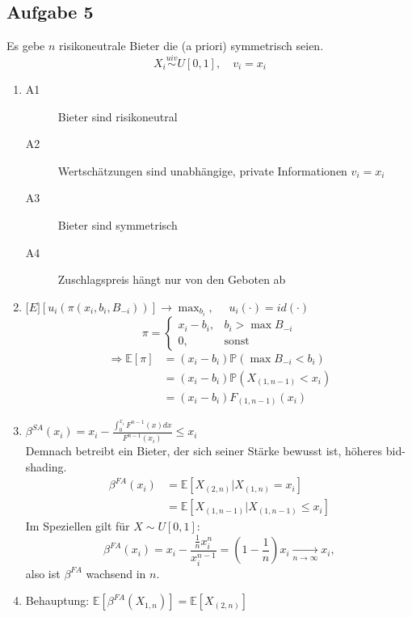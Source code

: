 \documentclass[12pt]{extreport} %
\theoremstyle{named}
\theoremstyle{itshape}
\theoremstyle{normal}
\begin{document}
\subsection*{Aufgabe 5}

Es gebe $n$ risikoneutrale Bieter die (a priori) symmetrisch seien.
$$ X_{i} \overset{uiv}{\sim} U[0,1], \quad v_i = x_i $$
\begin{enumerate}
	\item \begin{description}
		\item[A1] Bieter sind risikoneutral
		\item[A2] Wertschätzungen sind unabhängige, private Informationen $v_i = x_i$ 
		\item[A3] Bieter sind symmetrisch
		\item[A4] Zuschlagspreis hängt nur von den Geboten ab
	\end{description}
	\item $\mathds[E]\left[u_i\left(\pi\left(x_i, b_i, B_{-i}\right)\right)\right]  \longrightarrow \max_{b_i}, \quad$ $u_i(\cdot) = id(\cdot)$
		$$ \pi = \begin{cases} x_i - b_i, & b_i > \max B_{-i} \\ 0, & \text{sonst} \end{cases} $$
		\begin{align*}
			\Rightarrow \mathds{E}[\pi] & = (x_i - b_i) \mathds{P}\left(\max B_{-i} < b_i\right) \\
			& = (x_i - b_i) \mathds{P}\left(X_{(1,n-1)} < x_i\right) \\
			& = (x_i - b_i) F_{(1,n-1)}(x_i)
		\end{align*}
	\item $\beta^{SA}(x_i) = x_i - \frac{\int_0^{x_{i}} F^{n-1}(x) dx}{F^{n-1}(x_i)} \leq x_i$ ~\\
		Demnach betreibt ein Bieter, der sich seiner Stärke bewusst ist, höheres bid-shading.
		\begin{align*}
			\beta^{FA}(x_i) & = \mathds{E}\left[ X_{(2,n)} \big| X_{(1,n)} = x_i \right] \\
			& = \mathds{E} \left[ X_{(1,n-1)} \big| X_{(1,n-1)} \leq x_i \right]
		\end{align*}
		Im Speziellen gilt für $X \sim U[0, 1]$:
		$$ \beta^{FA}(x_i) = x_i - \frac{\frac{1}{n} x_i^n}{x_i^{n-1}} = \left( 1 - \frac{1}{n} \right) x_i \xrightarrow[n \rightarrow \infty]{} x_i, $$
		also ist $\beta^{FA}$ wachsend in $n$.
	\item Behauptung: $\mathds{E}\left[ \beta^{FA}(X_{1,n}) \right] = \mathds{E}\left[ X_{(2,n)} \right]$ 

\end{enumerate}
\end{document}

